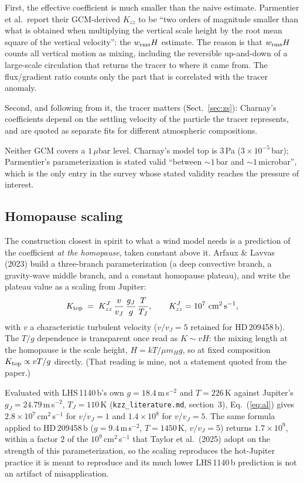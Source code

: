 \documentclass[english,a4paper]{my_memo}
\begin{document}
First, the effective coefficient is much smaller than the naive estimate.
Parmentier et al.\ report their GCM-derived $K_{zz}$ to be ``two orders of
magnitude smaller than what is obtained when multiplying the vertical scale
height by the root mean square of the vertical velocity'': the
$w_{\rm rms}H$ estimate. The reason is that $w_{\rm rms}H$ counts all
vertical motion as mixing, including the reversible up-and-down of a
large-scale circulation that returns the tracer to where it came from.
The flux/gradient ratio counts only the part that is correlated with the
tracer anomaly.

Second, and following from it, the tracer matters (Sect.~\ref{sec:zs}):
Charnay's coefficients depend on the settling velocity of the particle the
tracer represents, and are quoted as separate fits for different atmospheric
compositions.

Neither GCM covers a $1\,\mu$bar level. Charnay's model top is $3$\,Pa
($3\times10^{-5}$\,bar); Parmentier's parameterization is stated valid
``between $\sim 1$\,bar and $\sim 1$\,microbar'', which is the only entry in
the survey whose stated validity reaches the pressure of interest.

\subsection{Homopause scaling}
\label{sec:homo}

The construction closest in spirit to what a wind model needs is a
prediction of the coefficient \emph{at the homopause}, taken constant above
it. Arfaux \& Lavvas (2023) build a three-branch parameterization (a deep
convective branch, a gravity-wave middle branch, and a constant homopause
plateau), and write the plateau value as a scaling from Jupiter:
%
\begin{equation}
  K_{\rm top} \;=\; K_{zz}^{J}\,\frac{v}{v_J}\,\frac{g_J}{g}\,\frac{T}{T_J},
  \qquad K_{zz}^{J} = 10^{7}\ {\rm cm^{2}\,s^{-1}} ,
  \label{eq:al}
\end{equation}
%
with $v$ a characteristic turbulent velocity ($v/v_J = 5$ retained for
HD\,209458\,b). The $T/g$ dependence is transparent once read as
$K \sim vH$: the mixing length at the homopause is the scale height,
$H = kT/\mu m_H g$, so at fixed composition $K_{\rm top} \propto vT/g$
directly. (That reading is mine, not a statement quoted from the paper.)

Evaluated with LHS\,1140\,b's own $g = 18.4$\,m\,s$^{-2}$ and $T = 226$\,K
against Jupiter's $g_J = 24.79$\,m\,s$^{-2}$, $T_J = 110$\,K
(\texttt{kzz\_literature.md}, section~3), Eq.~(\ref{eq:al}) gives
$2.8\times10^{7}$\,cm$^{2}$\,s$^{-1}$ for $v/v_J = 1$ and
$1.4\times10^{8}$ for $v/v_J = 5$. The same formula applied to
HD\,209458\,b ($g = 9.4$\,m\,s$^{-2}$, $T = 1450$\,K, $v/v_J = 5$) returns
$1.7\times10^{9}$, within a factor $2$ of the $10^{9}$\,cm$^{2}$\,s$^{-1}$
that Taylor et al.\ (2025) adopt on the strength of this parameterization,
so the scaling reproduces the hot-Jupiter practice it is meant to reproduce
and its much lower LHS\,1140\,b prediction is not an artifact of
misapplication.
\end{document}
